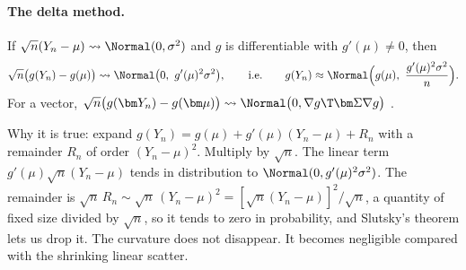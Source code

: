 \paragraph{The delta method.}
If $\sqrt n(Y_n-\mu)\rightsquigarrow\Normal(0,\sigma^2)$ and $g$ is
differentiable with $g'(\mu)\neq0$, then
\begin{equation}
  \sqrt n\bigl(g(Y_n)-g(\mu)\bigr)\rightsquigarrow\Normal\bigl(0,\ g'(\mu)^2\sigma^2\bigr),
  \qquad\text{i.e.}\qquad g(Y_n)\approx\Normal\Bigl(g(\mu),\ \frac{g'(\mu)^2\sigma^2}{n}\Bigr).
  \label{3a:eq:delta}
\end{equation}
For a vector, $\sqrt n\bigl(g(\bm Y_n)-g(\bm\mu)\bigr)\rightsquigarrow
\Normal\bigl(0,\nabla g\T\bm\Sigma\nabla g\bigr)$ .

Why it is true: expand $g(Y_n)=g(\mu)+g'(\mu)(Y_n-\mu)+R_n$ with a remainder
$R_n$ of order $(Y_n-\mu)^2$. Multiply by $\sqrt n$. The linear term
$g'(\mu)\sqrt n(Y_n-\mu)$ tends in distribution to $\Normal(0,g'(\mu)^2\sigma^2)$.
The remainder is $\sqrt n\,R_n\sim\sqrt n\,(Y_n-\mu)^2=[\sqrt n(Y_n-\mu)]^2/\sqrt n$,
a quantity of fixed size divided by $\sqrt n$, so it tends to zero in
probability, and Slutsky's theorem lets us drop it. The curvature does not
disappear. It becomes negligible compared with the shrinking linear scatter.

